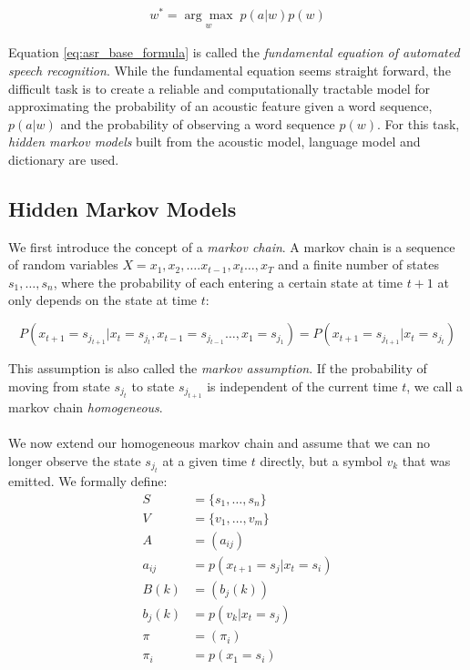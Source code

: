 \begin{align}
w^* = \underset{w}{\arg \max} \; p(a|w) p(w)
\label{eq:asr_base_formula}
\end{align}

Equation \ref{eq:asr_base_formula} is called the \textit{fundamental equation of automated speech recognition}. While the fundamental equation seems straight forward, the difficult task is to create a reliable and computationally tractable model for approximating the probability of an acoustic feature given a word sequence, $p(a|w)$ and the probability of observing a word sequence $p(w)$. For this task, \textit{hidden markov models} built from the acoustic model, language model and dictionary are used. 


 
\subsection{Hidden Markov Models}
We first introduce the concept of a \textit{markov chain}. A markov chain is a sequence of random variables $X = x_1, x_2, \dots. x_{t - 1}, x_{t} \dots, x_T$ and a finite number of states $s_1, \dots, s_n$, where the probability of each entering a certain state at time $t + 1$ at only depends on the state at time $t$:

\[
P(x_{t + 1} = s_{j_{t + 1}} | x_{t} = s_{j_t}, x_{t - 1} = s_{j_{t - 1}} \dots, x_{1} = s_{j_{1}}) = P(x_{t + 1} = s_{j_{t + 1}} | x_{t} = s_{j_t})
\] 

This assumption is also called the \textit{markov assumption}. If the probability of moving from state $s_{j_t}$ to state $s_{j_{t + 1}}$ is independent of the current time $t$, we call a markov chain \textit{homogeneous}. \\ \\
We now extend our homogeneous markov chain and assume that we can no longer observe the state $s_{j_t}$ at a given time $t$ directly, but a symbol $v_k$ that was emitted. We formally define: 
\begin{align*}
S &= \{s_1, \dots, s_n\} \tag{states} \\
V &= \{v_1, \dots, v_m\} \tag{symbols} \\
A &= (a_{ij}) \tag{state tansmission probability} \\
a_{ij} &= p(x_{t+1} = s_j | x_{t} = s_i) \\
B(k) &= (b_j(k)) \tag{emisson probability} \\
b_j(k) &= p(v_k | x_t = s_j) \\
\pi &= (\pi_i) \tag{initial state probability} \\
\pi_i &= p(x_1 = s_i)
\end{align*}

